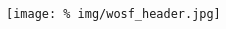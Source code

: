 \begin{frame}
\begin{columns}[t]
\begin{column}{0.59\textwidth}
    \end{column}
  \end{columns}

  \vspace{1.3cm}





  \begin{figure}
  \centering
  \texttt{[image: \%
  img/wosf\_header.jpg]} %
\end{figure}



\end{frame}

